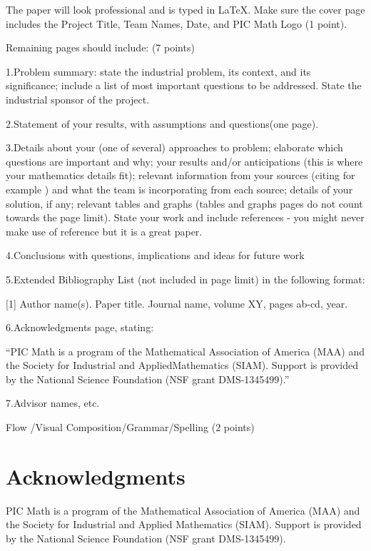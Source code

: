 \documentclass[12pt]{report}
\begin{document}
The paper will look professional and is typed in LaTeX. Make sure the cover page       includes the Project Title, Team Names, Date, and PIC Math Logo (1 point).

Remaining pages should include: (7 points) 

1.Problem summary: state the industrial problem, its context, and its significance; include a list of most important questions to be addressed. State the industrial sponsor of the project. 

2.Statement of your results, with assumptions and questions(one page).

3.Details about your (one of several) approaches to problem; elaborate which questions are important and why; your results and/or anticipations (this is where your mathematics details fit); relevant information from your sources (citing for example \cite{ACAMP}) and what the team is incorporating from each source; details of your solution, if any; relevant tables and graphs (tables and graphs pages do not count towards the page limit). State your work and include references - you might never make use of reference \cite{ACMT} but it is a great paper.

4.Conclusions with questions, implications and ideas for future work

5.Extended Bibliography List (not included in page limit) in the following format: 

[1] Author name(s). Paper title. Journal name, volume XY, pages ab-cd, year. 

6.Acknowledgments page, stating:

“PIC Math is a program of the Mathematical Association of America (MAA) and the Society for Industrial and AppliedMathematics (SIAM). Support is provided by the National Science Foundation (NSF grant DMS-1345499).”

7.Advisor names, etc. 

Flow /Visual Composition/Grammar/Spelling (2 points) 

\newpage
\section{Acknowledgments}

 PIC Math is a program of the Mathematical Association of America (MAA) and the Society for Industrial and Applied Mathematics (SIAM). Support is provided by the National Science Foundation (NSF grant DMS-1345499).
\newpage
 
\end{document}
